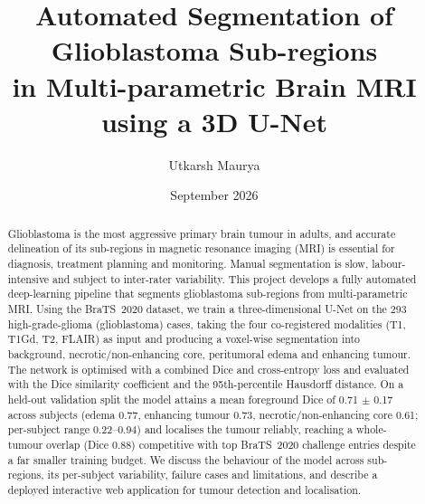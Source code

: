 \documentclass[11pt,a4paper]{report}
\title{\bfseries Automated Segmentation of Glioblastoma Sub-regions\\
in Multi-parametric Brain MRI using a 3D U-Net}
\author{Utkarsh Maurya}
\date{September 2026}
\begin{document}
\maketitle

\begin{abstract}
\noindent
Glioblastoma is the most aggressive primary brain tumour in adults, and accurate
delineation of its sub-regions in magnetic resonance imaging (MRI) is essential
for diagnosis, treatment planning and monitoring. Manual segmentation is slow,
labour-intensive and subject to inter-rater variability. This project develops a
fully automated deep-learning pipeline that segments glioblastoma sub-regions
from multi-parametric MRI. Using the BraTS~2020 dataset, we train a
three-dimensional U-Net on the 293 high-grade-glioma (glioblastoma) cases, taking
the four co-registered modalities (T1, T1Gd, T2, FLAIR) as input and producing a
voxel-wise segmentation into background, necrotic/non-enhancing core, peritumoral
edema and enhancing tumour. The network is optimised with a combined Dice and
cross-entropy loss and evaluated with the Dice similarity coefficient and the
95th-percentile Hausdorff distance. On a held-out validation split the model
attains a mean foreground Dice of 0.71 $\pm$ 0.17 across subjects (edema 0.77,
enhancing tumour 0.73, necrotic/non-enhancing core 0.61; per-subject range
0.22--0.94) and localises the tumour reliably, reaching a whole-tumour overlap
(Dice 0.88) competitive with top BraTS~2020 challenge entries despite a far
smaller training budget. We discuss the behaviour of the model across
sub-regions, its per-subject variability, failure cases and limitations, and
describe a deployed interactive web application for tumour detection and
localisation.
\end{abstract}

\tableofcontents










\end{document}
